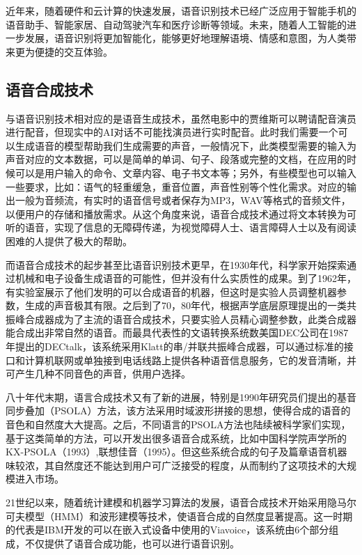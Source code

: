 近年来，随着硬件和云计算的快速发展，语音识别技术已经广泛应用于智能手机的语音助手、智能家居、自动驾驶汽车和医疗诊断等领域。未来，随着人工智能的进一步发展，语音识别将更加智能化，能够更好地理解语境、情感和意图，为人类带来更为便捷的交互体验。

\subsection{语音合成技术}

与语音识别技术相对应的是语音生成技术，虽然电影中的贾维斯可以聘请配音演员进行配音，但现实中的AI对话不可能找演员进行实时配音。此时我们需要一个可以生成语音的模型帮助我们生成需要的声音，一般情况下，此类模型需要的输入为声音对应的文本数据，可以是简单的单词、句子、段落或完整的文档，在应用的时候可以是用户输入的命令、文章内容、电子书文本等；另外，有些模型也可以输入一些要求，比如：语气的轻重缓急，重音位置，声音性别等个性化需求。对应的输出一般为音频流，有实时的语音信号或者保存为MP3，WAV等格式的音频文件，以便用户的存储和播放需求。从这个角度来说，语音合成技术通过将文本转换为可听的语音，实现了信息的无障碍传递，为视觉障碍人士、语言障碍人士以及有阅读困难的人提供了极大的帮助。

而语音合成技术的起步甚至比语音识别技术更早，在1930年代，科学家开始探索通过机械和电子设备生成语音的可能性，但并没有什么实质性的成果。到了1962年，有实验室展示了他们发明的可以合成语音的机器，但这时是实验人员调整机器参数，生成的声音极其有限。之后到了70，80年代，根据声学底层原理提出的一类共振峰合成器成为了主流的语音合成技术，只要实验人员精心调整参数，此类合成器能合成出非常自然的语音。而最具代表性的文语转换系统数美国DEC公司在1987年提出的DECtalk，该系统采用Klatt的串/并联共振峰合成器，可以通过标准的接口和计算机联网或单独接到电话线路上提供各种语音信息服务，它的发音清晰，并可产生几种不同音色的声音，供用户选择。

八十年代末期，语言合成技术又有了新的进展，特别是1990年研究员们提出的基音同步叠加（PSOLA）方法，该方法采用时域波形拼接的思想，使得合成的语音的音色和自然度大大提高。之后，不同语言的PSOLA方法也陆续被科学家们实现，基于这类简单的方法，可以开发出很多语音合成系统，比如中国科学院声学所的KX-PSOLA（1993）,联想佳音（1995）。但这些系统合成的句子及篇章语音机器味较浓，其自然度还不能达到用户可广泛接受的程度，从而制约了这项技术的大规模进入市场。

21世纪以来，随着统计建模和机器学习算法的发展，语音合成技术开始采用隐马尔可夫模型（HMM）和波形建模等技术，使语音合成的自然度显著提高。这一时期的代表是IBM开发的可以在嵌入式设备中使用的Viavoice，该系统由6个部分组成，不仅提供了语音合成功能，也可以进行语音识别。

